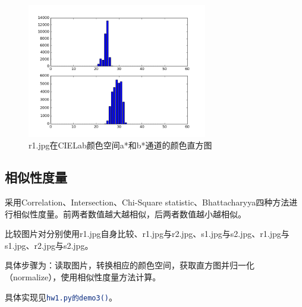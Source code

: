 \documentclass[a4paper, 12pt, UTF8]{article}
\begin{document}
\begin{enumerate}
\begin{figure}[h!]
    \centering
    \includegraphics[width=0.7\textwidth]{out/demo2_r1_Lab.png}
    \caption{r1.jpg在CIELab颜色空间a*和b*通道的颜色直方图}
    \label{figure_demo2_r1_Lab}
\end{figure}

\end{enumerate}


\subsection{相似性度量}

采用Correlation、Intersection、Chi-Square statistic、Bhattacharyya四种方法进行相似性度量。前两者数值越大越相似，后两者数值越小越相似。

比较图片对分别使用r1.jpg自身比较、r1.jpg与r2.jpg、s1.jpg与s2.jpg、r1.jpg与s1.jpg、r2.jpg与s2.jpg。

具体步骤为：读取图片，转换相应的颜色空间，获取直方图并归一化（normalize），使用相似性度量方法计算。

具体实现见\lstinline[language=bash]{hw1.py的demo3()}。
\end{document}
